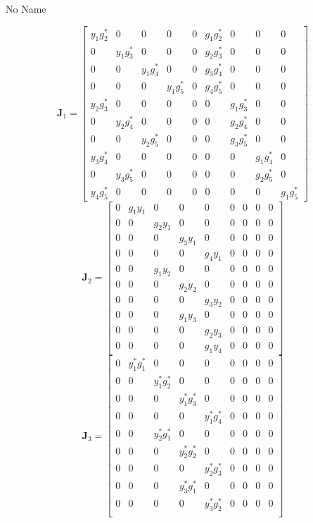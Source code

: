 \documentclass[a4paper,10pt]{article}
\begin{document}
\begin{section}{No Name}
\begin{landscape}
\begin{equation}
\boldsymbol{J}_1 = 
\begin{bmatrix}
y_1g_2^*&0&0&0&0&g_1g_2^*&0&0&0\\
0&y_1g_3^*&0&0&0&g_2g_3^*&0&0&0\\
0&0&y_1g_4^*&0&0&g_3g_4^*&0&0&0\\
0&0&0&y_1g_5^*&0&g_4g_5^*&0&0&0\\
y_2g_3^*&0&0&0&0&0&g_1g_3^*&0&0\\
0&y_2g_4^*&0&0&0&0&g_2g_4^*&0&0\\
0&0&y_2g_5^*&0&0&0&g_3g_5^*&0&0\\
y_3g_4^*&0&0&0&0&0&0&g_1g_4^*&0\\
0&y_3g_5^*&0&0&0&0&0&g_2g_5^*&0\\
y_4g_5^*&0&0&0&0&0&0&0&g_1g_5^*
\end{bmatrix}
\end{equation}
\begin{equation}
\boldsymbol{J}_2 = 
\begin{bmatrix}
0&g_1y_1&0&0&0&0&0&0&0\\
0&0&g_2y_1&0&0&0&0&0&0\\
0&0&0&g_3y_1&0&0&0&0&0\\
0&0&0&0&g_4y_1&0&0&0&0\\
0&0&g_1y_2&0&0&0&0&0&0\\
0&0&0&g_2y_2&0&0&0&0&0\\
0&0&0&0&g_3y_2&0&0&0&0\\
0&0&0&g_1y_3&0&0&0&0&0\\
0&0&0&0&g_2y_3&0&0&0&0\\
0&0&0&0&g_1y_4&0&0&0&0
\end{bmatrix}
\end{equation}
\begin{equation}
\boldsymbol{J}_3 = 
\begin{bmatrix}
0&y_1^*g_1^*&0&0&0&0&0&0&0\\
0&0&y_1^*g_2^*&0&0&0&0&0&0\\
0&0&0&y_1^*g_3^*&0&0&0&0&0\\
0&0&0&0&y_1^*g_4^*&0&0&0&0\\
0&0&y_2^*g_1^*&0&0&0&0&0&0\\
0&0&0&y_2^*g_2^*&0&0&0&0&0\\
0&0&0&0&y_2^*g_3^*&0&0&0&0\\
0&0&0&y_3^*g_1^*&0&0&0&0&0\\
0&0&0&0&y_3^*g_2^*&0&0&0&0\\

\end{bmatrix}
\end{equation}
\end{landscape}
\end{section}
\end{document}
